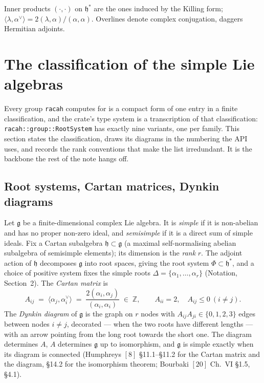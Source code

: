 \documentclass[11pt,a4paper]{article}
\theoremstyle{plain}
\theoremstyle{definition}
\newcommand{\g}{\mathfrak{g}}
\newcommand{\ZZ}{\mathbb{Z}}
\newcommand{\code}[1]{\texttt{#1}}
\begin{document}

\medskip
Inner products $(\cdot,\cdot)$ on $\mathfrak{h}^*$ are the ones induced by the
Killing form; $\langle\lambda,\alpha^\vee\rangle = 2(\lambda,\alpha)/(\alpha,\alpha)$.
Overlines denote complex conjugation, daggers Hermitian adjoints.

\section{The classification of the simple Lie algebras}
\label{sec:classification}

Every group \code{racah} computes for is a compact form of one entry in a
finite classification, and the crate's type system is a transcription of that
classification: \code{racah::group::RootSystem} has exactly nine variants,
one per family. This section states the classification, draws its diagrams in
the numbering the API uses, and records the rank conventions that make the
list irredundant. It is the backbone the rest of the note hangs off.

\subsection{Root systems, Cartan matrices, Dynkin diagrams}

Let $\g$ be a finite-dimensional complex Lie algebra. It is \emph{simple} if
it is non-abelian and has no proper non-zero ideal, and \emph{semisimple} if
it is a direct sum of simple ideals. Fix a Cartan subalgebra
$\mathfrak{h}\subset\g$ (a maximal self-normalising abelian subalgebra of
semisimple elements); its dimension is the \emph{rank} $r$. The adjoint action
of $\mathfrak{h}$ decomposes $\g$ into root spaces, giving the root system
$\Phi\subset\mathfrak{h}^*$, and a choice of positive system fixes the simple
roots $\Delta=\{\alpha_1,\dots,\alpha_r\}$ (Notation, Section~2). The
\emph{Cartan matrix} is
\begin{equation}\label{eq:cartan}
  A_{ij} \;=\; \langle \alpha_j, \alpha_i^\vee\rangle
        \;=\; \frac{2(\alpha_i,\alpha_j)}{(\alpha_i,\alpha_i)}
        \;\in\;\ZZ,
  \qquad A_{ii}=2,\quad A_{ij}\le 0 \ (i\neq j).
\end{equation}
The \emph{Dynkin diagram} of $\g$ is the graph on $r$ nodes with
$A_{ij}A_{ji}\in\{0,1,2,3\}$ edges between nodes $i\neq j$, decorated --- when
the two roots have different lengths --- with an arrow pointing from the long
root towards the short one. The diagram determines $A$, $A$ determines $\g$
up to isomorphism, and $\g$ is simple exactly when its diagram is connected
(Humphreys $[8]$ \S11.1--\S11.2 for the Cartan matrix and the diagram,
\S14.2 for the isomorphism theorem; Bourbaki $[20]$ Ch.~VI \S1.5, \S4.1).
\end{document}
